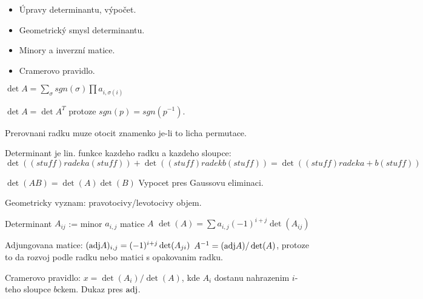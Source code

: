 \begin{itemize}
\item Úpravy determinantu, výpočet.
\item Geometrický smysl determinantu.
\item Minory a inverzní matice.
\item Cramerovo pravidlo.
\end{itemize}

\begin{understood}
$\det A=\sum_{\sigma} sgn(\sigma)\prod a_{i,\sigma(i)}$
\end{understood}

$\det A=\det A^T$ protoze $sgn(p)=sgn(p^{-1})$.

Prerovnani radku muze otocit znamenko je-li to licha permutace.

Determinant je lin. funkce kazdeho radku a kazdeho sloupce:
$\det((stuff) radek a (stuff))+\det((stuff) radek b (stuff))=\det((stuff) radek
a+b (stuff))$

\begin{understood}
$\det(AB)=\det(A)\det(B)$
Vypocet pres Gaussovu eliminaci.
\end{understood}
Geometricky vyznam: pravotocivy/levotocivy objem.

Determinant $A_{ij}$ := minor $a_{i,j}$ matice $A$
$\det(A)=\sum a_{i,j}(-1)^{i+j}\det(A_{ij})$

Adjungovana matice: $(\mathrm{adj} A)_{i,j}=(-1)^{i+j}\det(A_{ji})$
$A^{-1}=(\mathrm{adj} A)/\det(A)$, protoze to da rozvoj podle radku nebo matici
s opakovanim radku.

Cramerovo pravidlo: $x=\det(A_i)/\det(A)$, kde $A_i$ dostanu nahrazenim $i$-teho
sloupce $b$ckem. Dukaz pres $\mathrm{adj}$.
